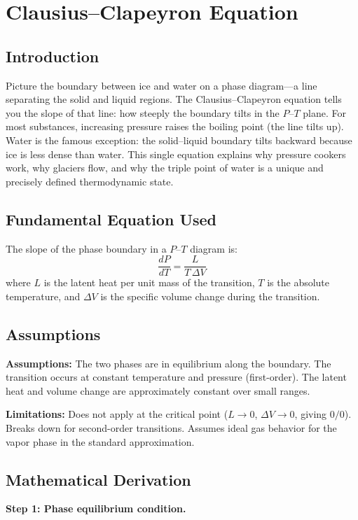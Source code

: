 \chapter{Clausius--Clapeyron Equation}

\section*{Introduction}

Picture the boundary between ice and water on a phase diagram---a line separating the solid and liquid regions. The Clausius--Clapeyron equation tells you the slope of that line: how steeply the boundary tilts in the $P$--$T$ plane. For most substances, increasing pressure raises the boiling point (the line tilts up). Water is the famous exception: the solid--liquid boundary tilts backward because ice is less dense than water. This single equation explains why pressure cookers work, why glaciers flow, and why the triple point of water is a unique and precisely defined thermodynamic state.
\section*{Fundamental Equation Used}

The slope of the phase boundary in a $P$--$T$ diagram is:
\[
\frac{dP}{dT} = \frac{L}{T\,\Delta V}
\]
where $L$ is the latent heat per unit mass of the transition, $T$ is the absolute temperature, and $\Delta V$ is the specific volume change during the transition.
\section*{Assumptions}

\textbf{Assumptions:} The two phases are in equilibrium along the boundary. The transition occurs at constant temperature and pressure (first-order). The latent heat and volume change are approximately constant over small ranges.


\textbf{Limitations:} Does not apply at the critical point ($L \to 0$, $\Delta V \to 0$, giving $0/0$). Breaks down for second-order transitions. Assumes ideal gas behavior for the vapor phase in the standard approximation.


\section*{Mathematical Derivation}

\textbf{Step 1: Phase equilibrium condition.}

